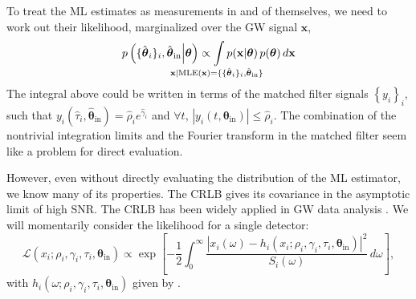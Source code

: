 \documentclass{iopart}
\def\clap#1{\hbox to 0pt{\hss#1\hss}}
\def\mathclap{\mathpalette\mathclapinternal}
\def\mathclapinternal#1#2{\clap{$\mathsurround=0pt#1{#2}$}}
\begin{document}
To treat the ML estimates as measurements in and of themselves, we need to work out their likelihood, marginalized over the GW signal $\mathbf{x}$,
%
\begin{equation}\label{eq:detection-candidate-likelihood}
    p\left(\{\hat{\boldsymbol\theta}_i\}_i,
        \hat{\boldsymbol\theta}_\mathrm{in}
    \middle| \boldsymbol\theta\right)
    \propto \int\limits_{\mathclap{\mathbf{x} | \mathrm{MLE}(\mathbf{x}) =
        \{\{\hat{\boldsymbol\theta}_i\}_i,
        \hat{\boldsymbol\theta}_\mathrm{in}\}}}
    p(\mathbf{x} | \boldsymbol\theta) \, p(\boldsymbol\theta)
    \, d\mathbf{x}
\end{equation}
%
The integral above could be written in terms of the matched filter signals $\left\{y_i\right\}_i$, such that $y_i\left(\hat\tau_i, \hat{\boldsymbol\theta}_\mathrm{in}\right) = \hat\rho_i e^{\hat\gamma_i}$ and $\forall t$, $\left|y_i(t, \boldsymbol\theta_\mathrm{in})\right| \leq \hat\rho_i$. The combination of the nontrivial integration limits and the Fourier transform in the matched filter seem like a problem for direct evaluation.

However, even without directly evaluating the distribution of the \ac{ML} estimator, we know many of its properties. The \ac{CRLB} gives its covariance in the asymptotic limit of high \ac{SNR}. The \ac{CRLB} has been widely applied in \ac{GW} data analysis \cite{fairhurst:2009}. We will momentarily consider the likelihood for a single detector:
%
\begin{equation}\label{eq:gaussian-likelihood-spa}
    \mathcal{L}\left(x_i; \rho_i, \gamma_i, \tau_i,
        \boldsymbol\theta_\mathrm{in}\right)
    \propto \exp \left[
        - \frac{1}{2} \int_0^\infty \frac{\left|x_i (\omega)
            - h_i\left(x_i; \rho_i, \gamma_i, \tau_i,
                \boldsymbol\theta_\mathrm{in}\right)
        \right|^2}{S_i(\omega)} \, d\omega
    \right],
\end{equation}
%
with $h_i(\omega; \rho_i, \gamma_i, \tau_i, \boldsymbol\theta_\mathrm{in})$ given by .
\end{document}
